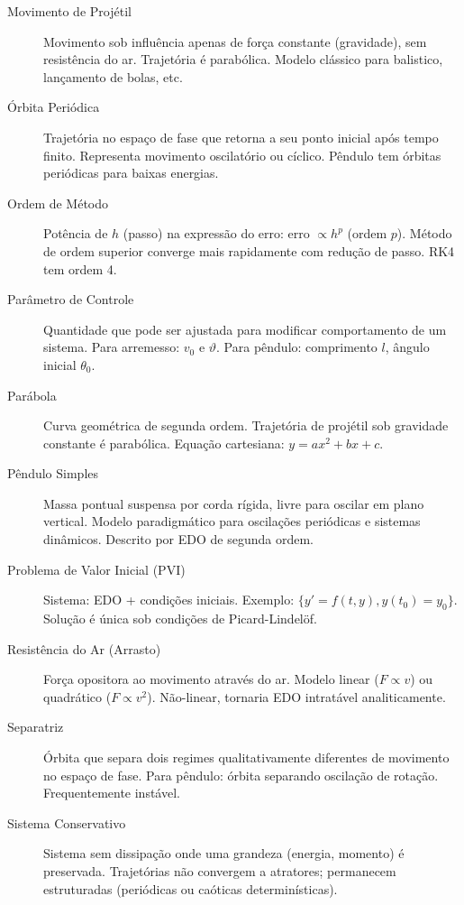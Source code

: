 \documentclass[12pt,a4paper]{article}
\begin{document}
\begin{description}
    \item[Movimento de Projétil] Movimento sob influência apenas de força constante (gravidade), sem resistência do ar. Trajetória é parabólica. Modelo clássico para balistico, lançamento de bolas, etc.
    
    \item[Órbita Periódica] Trajetória no espaço de fase que retorna a seu ponto inicial após tempo finito. Representa movimento oscilatório ou cíclico. Pêndulo tem órbitas periódicas para baixas energias.
    
    \item[Ordem de Método] Potência de $h$ (passo) na expressão do erro: erro $\propto h^p$ (ordem $p$). Método de ordem superior converge mais rapidamente com redução de passo. RK4 tem ordem 4.
    
    \item[Parâmetro de Controle] Quantidade que pode ser ajustada para modificar comportamento de um sistema. Para arremesso: $v_0$ e $\vartheta$. Para pêndulo: comprimento $l$, ângulo inicial $\theta_0$.
    
    \item[Parábola] Curva geométrica de segunda ordem. Trajetória de projétil sob gravidade constante é parabólica. Equação cartesiana: $y = ax^2 + bx + c$.
    
    \item[Pêndulo Simples] Massa pontual suspensa por corda rígida, livre para oscilar em plano vertical. Modelo paradigmático para oscilações periódicas e sistemas dinâmicos. Descrito por EDO de segunda ordem.
    
    \item[Problema de Valor Inicial (PVI)] Sistema: EDO + condições iniciais. Exemplo: $\{y' = f(t,y), y(t_0) = y_0\}$. Solução é única sob condições de Picard-Lindelöf.
    
    \item[Resistência do Ar (Arrasto)] Força opositora ao movimento através do ar. Modelo linear ($F \propto v$) ou quadrático ($F \propto v^2$). Não-linear, tornaria EDO intratável analiticamente.
    
    \item[Separatriz] Órbita que separa dois regimes qualitativamente diferentes de movimento no espaço de fase. Para pêndulo: órbita separando oscilação de rotação. Frequentemente instável.
    
    \item[Sistema Conservativo] Sistema sem dissipação onde uma grandeza (energia, momento) é preservada. Trajetórias não convergem a atratores; permanecem estruturadas (periódicas ou caóticas determinísticas).
    

\end{description}
\end{document}
